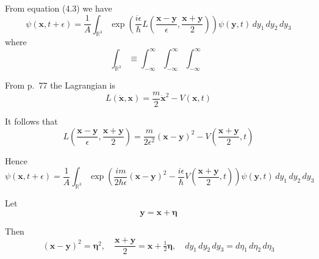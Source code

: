 


\bigskip
From equation (4.3) we have
\begin{equation*}
\psi(\mathbf{x},t+\epsilon)
=\frac{1}{A}\int_{\mathbb R^3}
\exp\left(
\frac{i\epsilon}{\hbar}L
\left(\frac{\mathbf{x}-\mathbf{y}}{\epsilon},\frac{\mathbf{x}+\mathbf{y}}{2}\right)
\right)\psi(\mathbf{y},t)\,dy_1\,dy_2\,dy_3
\tag{1}
\end{equation*}
where
\begin{equation*}
\int_{\mathbb R^3}
\equiv\int_{-\infty}^\infty\int_{-\infty}^\infty\int_{-\infty}^\infty
\end{equation*}

From p.~77 the Lagrangian is
\begin{equation*}
L(\dot{\mathbf x},\mathbf x)=\frac{m}{2}\dot{\mathbf x}^2-V(\mathbf{x},t)
\end{equation*}

It follows that
\begin{equation*}
L\left(\frac{\mathbf{x}-\mathbf{y}}{\epsilon},\frac{\mathbf{x}+\mathbf{y}}{2}\right)
=\frac{m}{2\epsilon^2}(\mathbf{x}-\mathbf{y})^2
-V\left(\frac{\mathbf{x}+\mathbf{y}}{2},t\right)
\end{equation*}

Hence
\begin{equation*}
\psi(\mathbf{x},t+\epsilon)=
\frac{1}{A}\int_{\mathbb R^3}
\exp\left(
\frac{im}{2\hbar\epsilon}(\mathbf{x}-\mathbf{y})^2
-\frac{i\epsilon}{\hbar}V\left(\frac{\mathbf{x}+\mathbf{y}}{2},t\right)
\right)
\psi(\mathbf{y},t)
\,dy_1\,dy_2\,dy_3
\end{equation*}

Let
\begin{equation*}
\mathbf y=\mathbf x+\boldsymbol\eta
\end{equation*}

Then
\begin{equation*}
(\mathbf x-\mathbf y)^2=\boldsymbol\eta^2,\quad
\frac{\mathbf x+\mathbf y}{2}=\mathbf{x}+\tfrac{1}{2}\boldsymbol\eta,\quad
dy_1\,dy_2\,dy_3=d\eta_1\,d\eta_2\,d\eta_3
\end{equation*}

